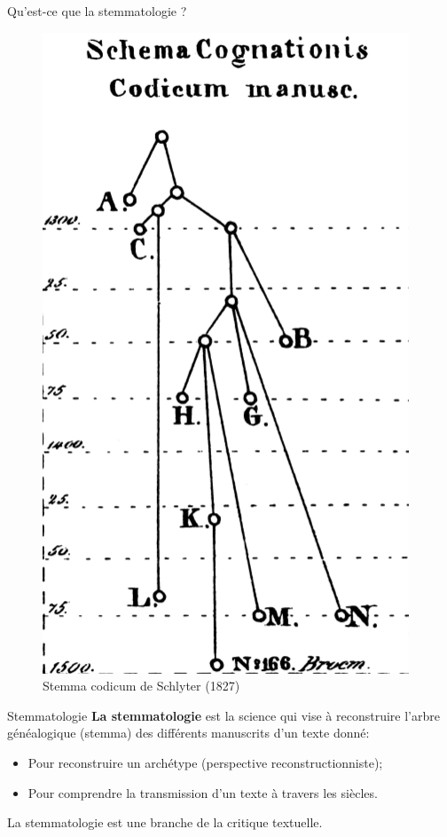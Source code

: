 \documentclass[11pt]{beamer}
\begin{document}
\begin{frame}{Qu'est-ce que la stemmatologie ?}
    \begin{minipage}{.4\textwidth}
        \begin{figure}
            \centering
            \includegraphics[width=0.7\linewidth]{img/stemmaschlyter.png}
            \caption{Stemma codicum de Schlyter (1827)}
        \end{figure} 
    \end{minipage}
    \hfill
    \begin{minipage}{.55\textwidth}
        \small{
        \begin{alertblock}{Stemmatologie}
            \textbf{La stemmatologie} est la science qui vise à reconstruire l'arbre généalogique (stemma) des différents manuscrits d'un texte donné:
            \begin{itemize}
                \item Pour \og reconstruire \fg un archétype (perspective reconstructionniste);
                \item Pour comprendre la transmission d'un texte à travers les siècles.
            \end{itemize}
        \end{alertblock}
        \vspace{.5cm}
        La stemmatologie est une branche de la critique textuelle.
        }
    \end{minipage}
\end{frame}
\end{document}
